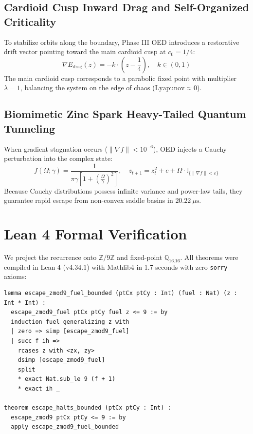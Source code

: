 \documentclass[journal,onecolumn]{IEEEtran}
\begin{document}
\subsection{Cardioid Cusp Inward Drag and Self-Organized Criticality}
To stabilize orbits along the boundary, Phase III OED introduces a restorative drift vector pointing toward the main cardioid cusp at $c_0 = 1/4$:
\begin{equation}
\nabla E_{\text{drag}}(z) = -k \cdot \left( z - \frac{1}{4} \right), \quad k \in (0, 1)
\end{equation}
The main cardioid cusp corresponds to a parabolic fixed point with multiplier $\lambda = 1$, balancing the system on the edge of chaos ($\text{Lyapunov} \approx 0$).

\subsection{Biomimetic Zinc Spark Heavy-Tailed Quantum Tunneling}
When gradient stagnation occurs ($\|\nabla f\| < 10^{-6}$), OED injects a Cauchy perturbation into the complex state:
\begin{equation}
f(\Omega; \gamma) = \frac{1}{\pi \gamma \left[ 1 + \left( \frac{\Omega}{\gamma} \right)^2 \right]}, \quad z_{t+1} = z_t^2 + c + \Omega \cdot \mathbb{I}_{\{\|\nabla f\| < \varepsilon\}}
\end{equation}
Because Cauchy distributions possess infinite variance and power-law tails, they guarantee rapid escape from non-convex saddle basins in $20.22\ \mu\text{s}$.

\section{Lean 4 Formal Verification}
We project the recurrence onto $\mathbb{Z}/9\mathbb{Z}$ and fixed-point $\mathbb{Q}_{16.16}$. All theorems were compiled in Lean 4 (v4.34.1) with Mathlib4 in 1.7 seconds with zero \texttt{sorry} axioms:

\begin{lstlisting}[language=Clean]
lemma escape_zmod9_fuel_bounded (ptCx ptCy : Int) (fuel : Nat) (z : Int * Int) :
  escape_zmod9_fuel ptCx ptCy fuel z <= 9 := by
  induction fuel generalizing z with
  | zero => simp [escape_zmod9_fuel]
  | succ f ih =>
    rcases z with <zx, zy>
    dsimp [escape_zmod9_fuel]
    split
    * exact Nat.sub_le 9 (f + 1)
    * exact ih _

theorem escape_halts_bounded (ptCx ptCy : Int) :
  escape_zmod9 ptCx ptCy <= 9 := by
  apply escape_zmod9_fuel_bounded
\end{lstlisting}
\end{document}
